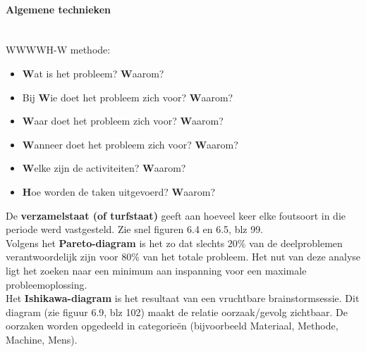 \documentclass[12pt]{article}
\begin{document}
\paragraph{Algemene technieken}\mbox{}\\
WWWWH-W methode:
\begin{itemize}
\item \textbf{W}at is het probleem? \textbf{W}aarom?
\item Bij \textbf{W}ie doet het probleem zich voor? \textbf{W}aarom?
\item \textbf{W}aar doet het probleem zich voor? \textbf{W}aarom?
\item \textbf{W}anneer doet het probleem zich voor? \textbf{W}aarom?
\item \textbf{W}elke zijn de activiteiten? \textbf{W}aarom?
\item \textbf{H}oe worden de taken uitgevoerd? \textbf{W}aarom?
\end{itemize}
De \textbf{verzamelstaat (of turfstaat)} geeft aan hoeveel keer elke foutsoort in die periode werd vastgesteld. Zie snel figuren 6.4 en 6.5, blz 99.\\
Volgens het \textbf{Pareto-diagram} is het zo dat slechts $20\%$ van de deelproblemen verantwoordelijk zijn voor $80\%$ van het totale probleem. Het nut van deze analyse ligt het zoeken naar een minimum aan inspanning voor een maximale probleemoplossing.\\
Het \textbf{Ishikawa-diagram} is het resultaat van een vruchtbare brainstormsessie. Dit diagram (zie figuur 6.9, blz 102) maakt de relatie oorzaak/gevolg zichtbaar. De oorzaken worden opgedeeld in categorie\"en (bijvoorbeeld Materiaal, Methode, Machine, Mens).
\end{document}
